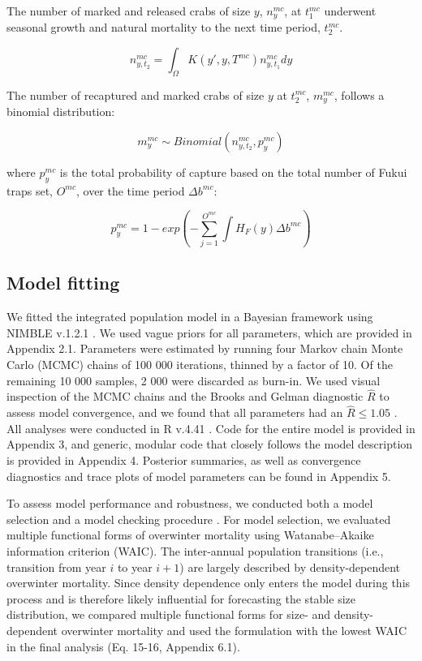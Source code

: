 \documentclass{article}
\begin{document}
The number of marked and released crabs of size $y$, $n_y^{mc}$, at $t_1^{mc}$ underwent seasonal growth and natural mortality to the next time period, $t_2^{mc}$.

\begin{equation}
n_{y,t_2}^{mc} = \int_{\Omega} K(y',y, T^{mc}) n_{y,t_1}^{mc} dy 
\end{equation}

The number of recaptured and marked crabs of size $y$ at $t_2^{mc}$, $m_{y}^{mc}$, follows a binomial distribution:

\begin{equation}
m_{y}^{mc} \sim Binomial(n_{y,t_2}^{mc}, p_y^{mc}) 
\end{equation}

where $p_y^{mc}$ is the total probability of capture based on the total number of Fukui traps set, $O^{mc}$, over the time period $\Delta b^{mc}$:

\begin{equation}
p_y^{mc} = 1-exp(-\sum_{j=1}^{O^{mc}}\int H_F(y)\Delta b^{mc})
\end{equation}


\subsection{Model fitting}
We fitted the integrated population model in a Bayesian framework using NIMBLE v.1.2.1 \parencite{de2017programming}. We used vague priors for all parameters, which are provided in Appendix 2.1. Parameters were estimated by running four Markov chain Monte Carlo (MCMC) chains of 100 000 iterations, thinned by a factor of 10. Of the remaining 10 000 samples, 2 000 were discarded as burn-in. We used visual inspection of the MCMC chains and the Brooks and Gelman diagnostic $\hat{R}$ to assess model convergence, and we found that all parameters had an $\hat{R} \leq 1.05$ \parencite{brooks1998general}. All analyses were conducted in R v.4.41 \parencite{Rcore}. Code for the entire model is provided in Appendix 3, and generic, modular code that closely follows the model description is provided in Appendix 4. Posterior summaries, as well as convergence diagnostics and trace plots of model parameters can be found in Appendix 5.

To assess model performance and robustness, we conducted both a model selection and a model checking procedure \parencite{conn2018guide}. For model selection, we evaluated multiple functional forms of overwinter mortality using Watanabe–Akaike information criterion (WAIC). The inter-annual population transitions (i.e., transition from year $i$ to year $i + 1$) are largely described by density-dependent overwinter mortality. Since density dependence only enters the model during this process and is therefore likely influential for forecasting the stable size distribution, we compared multiple functional forms for size- and density-dependent overwinter mortality and used the formulation with the lowest WAIC in the final analysis (Eq. 15-16, Appendix 6.1).
\end{document}
